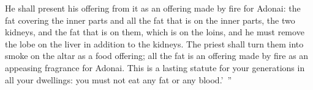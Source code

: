 \begin{biblechapter}
\verse He shall present his offering from it as an offering made by fire for Adonai: the fat covering the inner parts and all the fat that is on the inner parts,
\verse the two kidneys, and the fat that is on them, which is on the loins, and he must remove the lobe on the liver in addition to the kidneys.
\verse The priest shall turn them into smoke on the altar as a food offering; all the fat is an offering made by fire as an appeasing fragrance for Adonai.
\verse This is a lasting statute for your generations in all your dwellings: you must not eat any fat or any blood.’ ”
\end{biblechapter}

